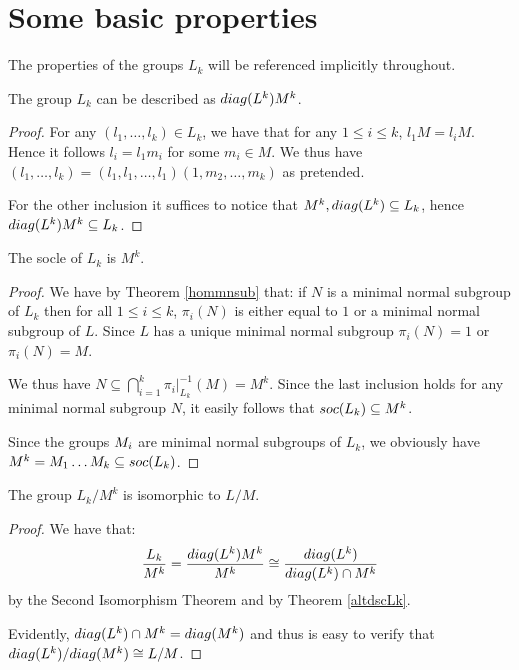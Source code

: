 \section{Some basic properties}
The properties of the groups \(L_k\) will be referenced implicitly throughout.


\begin{theorem}
    \label{altdscLk}
     The group $L_k$ can be described as $\diag{L^{k}}M^{k}$.
\end{theorem}

\begin{proof}
    For any $(l_1,\ldots ,l_k) \in L_k$, we have that for any $1 \le i \le k$, $l_1M = l_iM$. Hence it follows $l_i = l_1m_i$ for some $m_i \in M$. We thus have $(l_1,\ldots ,l_k) = (l_1,l_1,\ldots ,l_1)(1,m_2,\ldots ,m_k)$ as pretended. 
    
    For the other inclusion it suffices to notice that $M^k, \diag{L^k} \subseteq L_k$, hence $\diag{L^k}M^k \subseteq L_k$.
\end{proof}

\begin{theorem}
    The socle of $L_k$ is $M^k$.
\end{theorem}

\begin{proof}
    We have by Theorem \ref{hommnsub} that: if $N$ is a minimal normal subgroup of $L_k$ then for all $1 \le i \le k$, $\pi_i(N)$ is either equal to $1$ or a minimal normal subgroup of $L$. Since $L$ has a unique minimal normal subgroup $\pi_i(N) = 1$ or $\pi_i(N) = M$.
    
    We thus have $N \subseteq \bigcap_{i=1}^{k} \pi_i|_{L_k}^{-1}(M) = M^{k}$. Since the last inclusion holds for any minimal normal subgroup $N$, it easily follows that $\soc{L_k} \subseteq M^k$.

    Since the groups $\Mi$ are minimal normal subgroups of $L_k$, we obviously have $M^k=\Mi[1]\ldots \Mi[k] \subseteq \soc{L_k}$.
\end{proof}

\begin{theorem}
    \label{qtLksoc}
    The group $L_k/M^k$ is isomorphic to $L/M$.
\end{theorem}

\begin{proof}
    We have that:
    $$
        \frac{L_k}{M^k}=\frac{\diag{L^k}M^k}{M^k} \cong \frac{\diag{L^k}}{\diag{L^k} \cap M^k}
    $$
    by the Second Isomorphism Theorem and by Theorem \ref{altdscLk}. 
    
    Evidently, $\diag{L^k} \cap M^k = \diag{M^k}$ and thus is easy to verify that $\diag{L^k}/\diag{M^k} \cong L/M$.
\end{proof}

